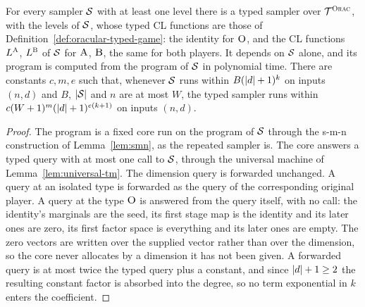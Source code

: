 \begin{lemma}
\label{lem:oracle-typed-sampler}
\leanok
For every sampler $\mathcal{S}$ with at least one level there is a typed sampler over
$\mathcal{T}^{\textsc{Orac}}$, with the levels of $\mathcal{S}$, whose typed CL functions are those of
Definition~\ref{def:oracular-typed-game}: the identity for $\textsc{O}$, and the CL functions
$L^{\textsc{A}}$, $L^{\textsc{B}}$ of $\mathcal{S}$ for $\textsc{A}$, $\textsc{B}$, the same for both players. It depends on
$\mathcal{S}$ alone, and its program is computed from the program of $\mathcal{S}$ in polynomial time.
There are constants $c, m, e$ such that, whenever $\mathcal{S}$ runs within $B(\left\vert {d} \right\vert + 1)^k$ on
inputs $(n, d)$ and $B$, $\left\vert {\mathcal{S}} \right\vert$ and $n$ are at most $W$, the typed sampler runs within
$c(W + 1)^m(\left\vert {d} \right\vert + 1)^{e(k + 1)}$ on inputs $(n, d)$.
\end{lemma}
\begin{proof}
\leanok
The program is a fixed core run on the program of $\mathcal{S}$ through the s-m-n construction of
Lemma~\ref{lem:smn}, as the repeated sampler is. The core answers a typed query with at most one
call to $\mathcal{S}$, through the universal machine of Lemma~\ref{lem:universal-tm}. The dimension
query is forwarded unchanged. A query at an isolated type is forwarded as the query of the
corresponding original player. A query at the type $\textsc{O}$ is answered from the query itself,
with no call: the identity's marginals are the seed, its first stage map is the identity and its
later ones are zero, its first factor space is everything and its later ones are empty. The zero
vectors are written over the supplied vector rather than over the dimension, so the core never
allocates by a dimension it has not been given. A forwarded query is at most twice the typed
query plus a constant, and since $\left\vert {d} \right\vert + 1 \geq 2$ the resulting constant factor is absorbed
into the degree, so no term exponential in $k$ enters the coefficient.
\end{proof}

